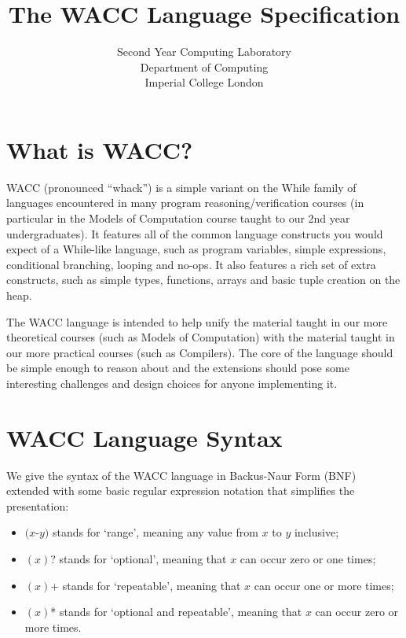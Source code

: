 \documentclass[a4paper]{article}
\theoremstyle{definition}
\begin{document}
\title{The WACC Language Specification}
\date{}
\author{
Second Year Computing Laboratory \\ 
Department of Computing \\ 
Imperial College London
}

\maketitle

\section{What is WACC?}
WACC (pronounced ``whack'') is a simple variant on the While family of languages encountered in many program reasoning/verification courses
(in particular in the Models of Computation course taught to our 2nd year undergraduates).
It features all of the common language constructs you would expect of a While-like language, 
such as program variables, simple expressions, conditional branching, looping and no-ops.
It also features a rich set of extra constructs, such as simple types, functions, arrays and basic tuple creation on the heap.

The WACC language is intended to help unify the material taught in our more theoretical courses (such as Models of Computation) 
with the material taught in our more practical courses (such as Compilers).
The core of the language should be simple enough to reason about 
and the extensions should pose some interesting challenges and design choices for anyone implementing it.


\section{WACC Language Syntax}
We give the syntax of the WACC language in Backus-Naur Form (BNF) 
extended with some basic regular expression notation that simplifies the presentation:
\begin{itemize}
 \item $(x$-$y)$ stands for `range', meaning any value from $x$ to $y$ inclusive;
 \item $(x)$? stands for `optional', meaning that $x$ can occur zero or one times;
 \item $(x)$+ stands for `repeatable', meaning that $x$ can occur one or more times;
 \item $(x)$* stands for `optional and repeatable', meaning that $x$ can occur zero or more times.
\end{itemize}
\end{document}
